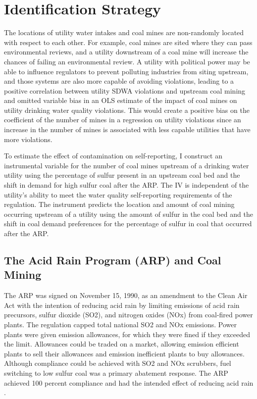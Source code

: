 \documentclass{article}
\begin{document}



\section{Identification Strategy}

The locations of utility water intakes and coal mines are non-randomly located with respect to each other. For example, coal mines are sited where they can pass environmental reviews, and a utility downstream of a coal mine will increase the chances of failing an environmental review. A utility with political power may be able to influence regulators to prevent polluting industries from siting upstream, and those systems are also more capable of avoiding violations, leading to a positive correlation between utility SDWA violations and upstream coal mining and omitted variable bias in an OLS estimate of the impact of coal mines on utility drinking water quality violations. This would create a positive bias on the coefficient of the number of mines in a regression on utility violations since an increase in the number of mines is associated with less capable utilities that have more violations.

To estimate the effect of contamination on self-reporting, I construct an instrumental variable for the number of coal mines upstream of a drinking water utility using the percentage of sulfur present in an upstream coal bed and the shift in demand for high sulfur coal after the ARP. The IV is independent of the utility's ability to meet the water quality self-reporting requirements of the regulation. The instrument predicts the location and amount of coal mining occurring upstream of a utility using the amount of sulfur in the coal bed and the shift in coal demand preferences for the percentage of sulfur in coal that occurred after the ARP.

\subsection{The Acid Rain Program (ARP) and Coal Mining}

The ARP was signed on November 15, 1990, as an amendment to the Clean Air Act with the intention of reducing acid rain by limiting emissions of acid rain precursors, sulfur dioxide (SO2), and nitrogen oxides (NOx) from coal-fired power plants. The regulation capped total national SO2 and NOx emissions. Power plants were given emission allowances, for which they were fined if they exceeded the limit. Allowances could be traded on a market, allowing emission efficient plants to sell their allowances and emission inefficient plants to buy allowances. Although compliance could be achieved with SO2 and NOx scrubbers, fuel switching to low sulfur coal was a primary abatement response. The ARP achieved 100 percent compliance and had the intended effect of reducing acid rain \parencite{lattanzio2022clean}. 
\end{document}

